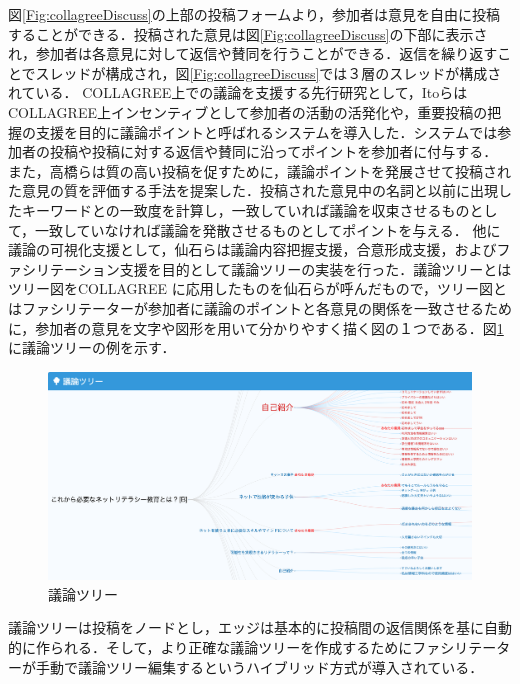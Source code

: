 図\ref{Fig:collagreeDiscuss}の上部の投稿フォームより，参加者は意見を自由に投稿することができる．投稿された意見は図\ref{Fig:collagreeDiscuss}の下部に表示され，参加者は各意見に対して返信や賛同を行うことができる．返信を繰り返すことでスレッドが構成され，図\ref{Fig:collagreeDiscuss}では３層のスレッドが構成されている．
%
COLLAGREE上での議論を支援する先行研究として，Itoら\cite{discSupport1-1}はCOLLAGREE上インセンティブとして参加者の活動の活発化や，重要投稿の把握の支援を目的に議論ポイントと呼ばれるシステムを導入した．システムでは参加者の投稿や投稿に対する返信や賛同に沿ってポイントを参加者に付与する．
また，高橋ら\cite{discSupport1-2}は質の高い投稿を促すために，議論ポイントを発展させて投稿された意見の質を評価する手法を提案した．投稿された意見中の名詞と以前に出現したキーワードとの一致度を計算し，一致していれば議論を収束させるものとして，一致していなければ議論を発散させるものとしてポイントを与える．
他に議論の可視化支援として，仙石ら\cite{argTree}は議論内容把握支援，合意形成支援，およびファシリテーション支援を目的として議論ツリーの実装を行った．議論ツリーとはツリー図をCOLLAGREE に応用したものを仙石らが呼んだもので，ツリー図とはファシリテーターが参加者に議論のポイントと各意見の関係を一致させるために，参加者の意見を文字や図形を用いて分かりやすく描く図の１つである．図\ref{Fig:argTree1}に議論ツリーの例を示す．
\begin{figure}[htbp]
 \begin{center}
  \includegraphics[width=\textwidth]{../images/2.Related_Work/argTree1.png}
  \caption{議論ツリー}
  \label{Fig:argTree1}
  \vspace{-10pt}
 \end{center}
\end{figure}
議論ツリーは投稿をノードとし，エッジは基本的に投稿間の返信関係を基に自動的に作られる．そして，より正確な議論ツリーを作成するためにファシリテーターが手動で議論ツリー編集するというハイブリッド方式が導入されている．

